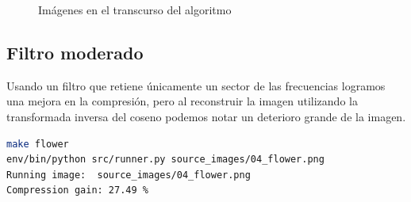 \documentclass[spanish]{scrartcl}
\begin{document}
\begin{figure}[!htbp]
    \caption{Imágenes en el transcurso del algoritmo}
    \label{fig:original}
\end{figure}


\subsection{Filtro moderado}

Usando un filtro que retiene únicamente un sector de las frecuencias logramos una mejora en la compresión, pero al reconstruir la imagen utilizando la transformada inversa del coseno podemos notar un deterioro grande de la imagen.



\begin{lstlisting}[language=bash]
make flower
env/bin/python src/runner.py source_images/04_flower.png
Running image:  source_images/04_flower.png
Compression gain: 27.49 %
\end{lstlisting}
\end{document}
